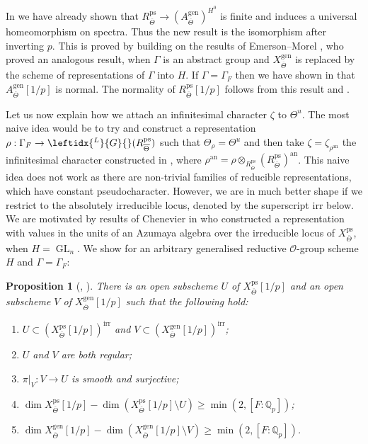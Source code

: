 \documentclass{amsart}
\newtheorem{prop}{Proposition}[section]
\theoremstyle{definition}
\theoremstyle{remark}
\DeclareMathOperator{\GL}{GL}
\newcommand{\Qp}{\mathbb {Q}_p}
\newcommand{\OO}{\mathcal O}
\newcommand{\ana}{\mathrm{an}}
\newcommand{\gen}{\mathrm{gen}}
\newcommand{\irr}{\mathrm{irr}}
\newcommand{\Thetabar}{\overline{\Theta}}
\newcommand{\ps}{\mathrm{ps}}
\newcommand{\LG}{\leftidx{^L}{G}{}}
\begin{document}
In \cite{defG} we have already shown that $R^{\ps}_{\Thetabar}\rightarrow (A^{\gen}_{\Thetabar})^{H^0}$
is finite and induces a universal homeomorphism on spectra. Thus the new result is the isomorphism after inverting $p$. This is proved by building on the results of Emerson--Morel \cite{emerson2023comparison}, 
who proved an analogous result, when $\Gamma$ is an abstract group and $X^{\gen}_{\Thetabar}$ is 
replaced by the scheme of representations 
of $\Gamma$ into $H$. If $\Gamma=\Gamma_F$ then we have shown in \cite{defG} that $A^{\gen}_{\Thetabar}[1/p]$ is normal. The normality of $R^{\ps}_{\Thetabar}[1/p]$ follows from this result and .

Let us now explain how we attach an infinitesimal character $\zeta$ to $\Theta^u$. The most naive idea would be to try and construct a representation 
$\rho: \Gamma_F \rightarrow \LG(R^{\ps}_{\Thetabar})$ such that $\Theta_{\rho}= \Theta^u$ and then 
take $\zeta= \zeta_{\rho^{\ana}}$ the infinitesimal character constructed in \cite{DPS}, where $\rho^{\ana}= \rho\otimes_{R^{\ps}_{\Thetabar}} (R^{\ps}_{\Thetabar})^{\ana}$. This naive idea does not work as there are non-trivial families of reducible representations, which have constant pseudocharacter.  
However, we are in much better shape if we restrict to the absolutely
irreducible locus, denoted by the superscript $\irr$ below.  We are motivated by results of Chenevier in 
\cite{che_durham} who constructed a representation with values 
in the units of an Azumaya algebra over the irreducible 
locus of $X^{\ps}_{\Thetabar}$, when  $H=\GL_n$. 
We show for an arbitrary generalised reductive $\OO$-group scheme $H$ and $\Gamma=\Gamma_F$:  
\begin{prop}[, ]\label{intro_nice_locus}  There is an open  subscheme $U$ of $X^{\ps}_{\Thetabar}[1/p]$
and an open subscheme $V$ of $X^{\gen}_{\Thetabar}[1/p]$ such that the  following hold:
\begin{enumerate}
\item $U\subset (X^{\ps}_{\Thetabar}[1/p])^{\irr}$ and $V\subset (X^{\gen}_{\Thetabar}[1/p])^{\irr}$;
\item $U$ and $V$ are both regular;
\item $\pi|_V:V\rightarrow U$ is smooth and surjective;
\item $\dim X^{\ps}_{\Thetabar}[1/p] - \dim (X^{\ps}_{\Thetabar}[1/p]\setminus U) \ge \min(2, [F:\Qp])$;
\item 
$\dim X^{\gen}_{\Thetabar}[1/p] - \dim (X^{\gen}_{\Thetabar}[1/p]\setminus V)\ge \min(2, [F:\Qp])$.
\end{enumerate} 
 \end{prop} 
\end{document}
